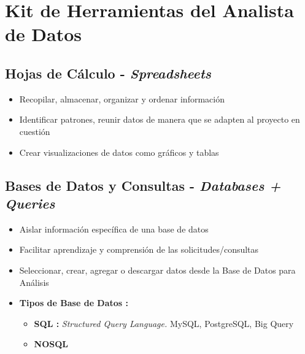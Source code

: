 \section {Kit de Herramientas del Analista de Datos}

\subsection{Hojas de Cálculo - \textit{Spreadsheets}}
\begin{itemize}
    \item {Recopilar, almacenar, organizar y ordenar información}
    \item {Identificar patrones, reunir datos de manera que se adapten al proyecto en cuestión}
    \item {Crear visualizaciones de datos como gráficos y tablas}
\end{itemize}

\subsection{Bases de Datos y Consultas - \textit{Databases + Queries}}
\begin{itemize}
    \item {Aislar información específica de una base de datos}
    \item {Facilitar aprendizaje y comprensión de las solicitudes/consultas}
    \item {Seleccionar, crear, agregar o descargar datos desde la Base de Datos para Análisis}
    \item {\textbf{Tipos de Base de Datos : }
    \begin{itemize}
        \item {\textbf{SQL : }\textit{Structured Query Language.} MySQL, PostgreSQL, Big Query}
        \item {\textbf{NOSQL}}
    \end{itemize}}
\end{itemize}

